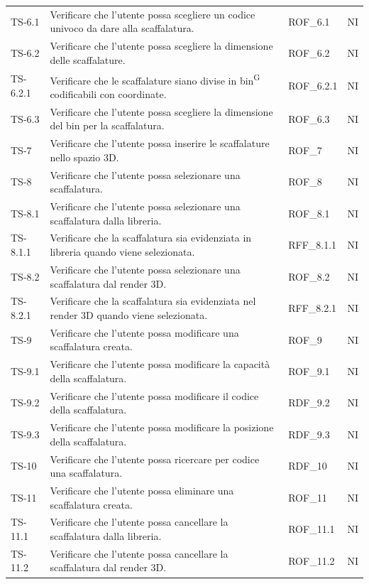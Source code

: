\begin{xltabular}{0.9\textwidth}{X | p{0.5\textwidth} | X | X}
    TS-6.1 & Verificare che l'utente possa scegliere un codice univoco da dare alla scaffalatura. & ROF\_6.1& NI\\
    TS-6.2 &Verificare che l'utente possa scegliere la dimensione delle scaffalature. & ROF\_6.2& NI\\
    TS-6.2.1& Verificare che le scaffalature siano divise in bin\textsuperscript{G} codificabili con coordinate. & ROF\_6.2.1& NI\\
    TS-6.3 & Verificare che l'utente possa scegliere la dimensione del bin per la scaffalatura. & ROF\_6.3& NI\\
    TS-7 & Verificare che l'utente possa inserire le scaffalature nello spazio 3D. & ROF\_7& NI\\
    TS-8 & Verificare che l'utente possa selezionare una scaffalatura. & ROF\_8& NI \\
    TS-8.1 & Verificare che l'utente possa selezionare una scaffalatura dalla libreria. & ROF\_8.1& NI\\
    TS-8.1.1 &  Verificare che la scaffalatura sia evidenziata in libreria quando viene selezionata. & RFF\_8.1.1& NI\\
    TS-8.2 & Verificare che l'utente possa selezionare una scaffalatura dal render 3D. & ROF\_8.2& NI\\
    TS-8.2.1 & Verificare che la scaffalatura sia evidenziata nel render 3D quando viene selezionata. & RFF\_8.2.1& NI\\
    TS-9 & Verificare che l'utente possa modificare una scaffalatura creata. & ROF\_9& NI\\
    TS-9.1 & Verificare che l'utente possa modificare la capacità della scaffalatura. & ROF\_9.1& NI\\
    TS-9.2 & Verificare che l'utente possa modificare il codice della scaffalatura. & RDF\_9.2& NI \\
    TS-9.3 & Verificare che l'utente possa modificare la posizione della scaffalatura. & RDF\_9.3 & NI \\
    TS-10 & Verificare che l'utente possa ricercare per codice una scaffalatura. & RDF\_10& NI\\
    TS-11 & Verificare che l'utente possa eliminare una scaffalatura creata. &  ROF\_11& NI\\
    TS-11.1 & Verificare che l'utente possa cancellare la scaffalatura dalla libreria.& ROF\_11.1 & NI\\
    TS-11.2& Verificare che l'utente possa cancellare la scaffalatura dal render 3D. & ROF\_11.2& NI\\

\end{xltabular}

